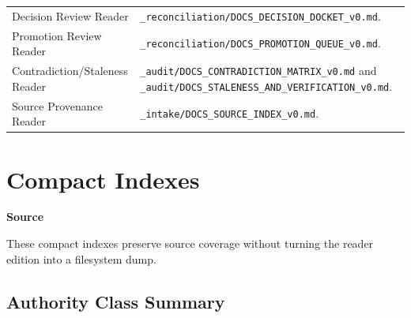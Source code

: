 \documentclass[10.5pt,a4paper,openany]{book}
\newcommand{\bottomrule}{\hline}
\newcommand{\vonecallout}[3]{\par\medskip\noindent\begingroup\setlength{\fboxsep}{7pt}\colorbox{DomCalloutBg}{\parbox{0.94\linewidth}{\textbf{\textcolor{#1}{#2}}\par #3}}\endgroup\par\medskip}
\begin{document}
\begin{center}
{\begin{tabularx}{\linewidth}{@{}>{\raggedright\arraybackslash}X >{\raggedright\arraybackslash}X@{}}
Decision Review Reader & \texttt{\_\allowbreak{}reconciliation/\allowbreak{}DOCS\_\allowbreak{}DECISION\_\allowbreak{}DOCKET\_\allowbreak{}v0.\allowbreak{}md}.\allowbreak{} \\
Promotion Review Reader & \texttt{\_\allowbreak{}reconciliation/\allowbreak{}DOCS\_\allowbreak{}PROMOTION\_\allowbreak{}QUEUE\_\allowbreak{}v0.\allowbreak{}md}.\allowbreak{} \\
Contradiction/\allowbreak{}Staleness Reader & \texttt{\_\allowbreak{}audit/\allowbreak{}DOCS\_\allowbreak{}CONTRADICTION\_\allowbreak{}MATRIX\_\allowbreak{}v0.\allowbreak{}md} and \texttt{\_\allowbreak{}audit/\allowbreak{}DOCS\_\allowbreak{}STALENESS\_\allowbreak{}AND\_\allowbreak{}VERIFICATION\_\allowbreak{}v0.\allowbreak{}md}.\allowbreak{} \\
Source Provenance Reader & \texttt{\_\allowbreak{}intake/\allowbreak{}DOCS\_\allowbreak{}SOURCE\_\allowbreak{}INDEX\_\allowbreak{}v0.\allowbreak{}md}.\allowbreak{} \\
\bottomrule
\end{tabularx}
}
\end{center}



\chapter{Compact Indexes}

\vonecallout{DomSlate}{Source}{These compact indexes preserve source coverage without turning the reader edition into a filesystem dump.\allowbreak{}}

\section{Authority Class Summary}
\end{document}

